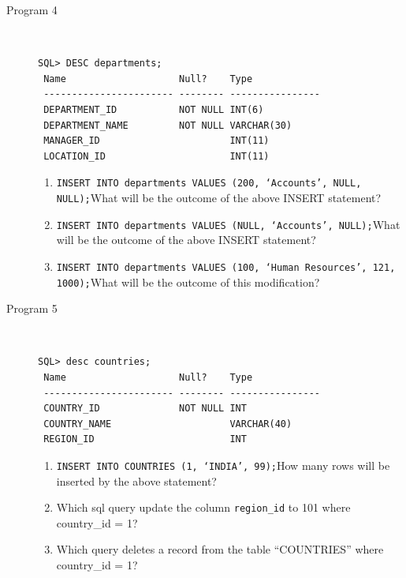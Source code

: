 \documentclass[11pt,a4paper]{article}
\def\AnswerBox{\fbox{\begin{minipage}{4in}\hfill\vspace{0.5in}\end{minipage}}}
\begin{document}
\begin{description}
\item [Program 4]\ 
\begin{verbatim}
SQL> DESC departments;
 Name                    Null?    Type
 ----------------------- -------- ----------------
 DEPARTMENT_ID           NOT NULL INT(6)
 DEPARTMENT_NAME         NOT NULL VARCHAR(30)
 MANAGER_ID                       INT(11)
 LOCATION_ID                      INT(11)
\end{verbatim}
\AnswerBox

\begin{enumerate}[label=\bfseries Q\arabic*:]\itemsep10pt
\item \texttt{INSERT INTO departments VALUES (200, `Accounts', NULL, NULL);}\newline What will be the outcome of the above INSERT statement?
\item \texttt{INSERT INTO departments VALUES (NULL, `Accounts', NULL);}\newline What will be the outcome of the above INSERT statement?
\item \texttt{INSERT INTO departments VALUES (100, `Human Resources', 121, 1000);}\newline What will be the outcome of this modification?
\end{enumerate}

\item [Program 5]\ 
\begin{verbatim}
SQL> desc countries;
 Name                    Null?    Type
 ----------------------- -------- ----------------
 COUNTRY_ID              NOT NULL INT
 COUNTRY_NAME                     VARCHAR(40)
 REGION_ID                        INT
\end{verbatim}
\AnswerBox

\begin{enumerate}[label=\bfseries Q\arabic*:]\itemsep10pt
\item \texttt{INSERT INTO COUNTRIES (1, `INDIA', 99);}\newline How many rows will be inserted by the above statement?
\item Which sql query update the column \texttt{region\_id} to 101 where country\_id = 1? 
\item Which query deletes a record from the table ``COUNTRIES'' where country\_id = 1?
\end{enumerate}
\end{description}
\end{document}
